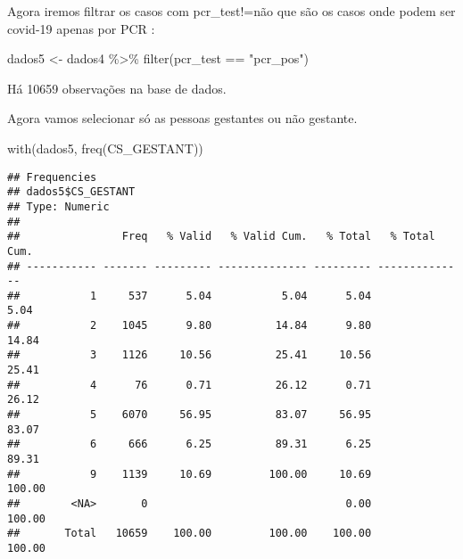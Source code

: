 \documentclass[
]{article}
\newenvironment{Shaded}{\begin{snugshade}}{\end{snugshade}}
\newcommand{\FunctionTok}[1]{\textcolor[rgb]{0.00,0.00,0.00}{#1}}
\newcommand{\NormalTok}[1]{#1}
\newcommand{\OtherTok}[1]{\textcolor[rgb]{0.56,0.35,0.01}{#1}}
\newcommand{\SpecialCharTok}[1]{\textcolor[rgb]{0.00,0.00,0.00}{#1}}
\newcommand{\StringTok}[1]{\textcolor[rgb]{0.31,0.60,0.02}{#1}}
\begin{document}
Agora iremos filtrar os casos com pcr\_test!=não que são os casos onde
podem ser covid-19 apenas por PCR :

\begin{Shaded}
\begin{Highlighting}[]
\NormalTok{dados5 }\OtherTok{\textless{}{-}}\NormalTok{ dados4 }\SpecialCharTok{\%\textgreater{}\%} 
  \FunctionTok{filter}\NormalTok{(pcr\_test }\SpecialCharTok{==} \StringTok{"pcr\_pos"}\NormalTok{)}
\end{Highlighting}
\end{Shaded}

Há 10659 observações na base de dados.

Agora vamos selecionar só as pessoas gestantes ou não gestante.

\begin{Shaded}
\begin{Highlighting}[]
\FunctionTok{with}\NormalTok{(dados5, }\FunctionTok{freq}\NormalTok{(CS\_GESTANT))}
\end{Highlighting}
\end{Shaded}

\begin{verbatim}
## Frequencies  
## dados5$CS_GESTANT  
## Type: Numeric  
## 
##                Freq   % Valid   % Valid Cum.   % Total   % Total Cum.
## ----------- ------- --------- -------------- --------- --------------
##           1     537      5.04           5.04      5.04           5.04
##           2    1045      9.80          14.84      9.80          14.84
##           3    1126     10.56          25.41     10.56          25.41
##           4      76      0.71          26.12      0.71          26.12
##           5    6070     56.95          83.07     56.95          83.07
##           6     666      6.25          89.31      6.25          89.31
##           9    1139     10.69         100.00     10.69         100.00
##        <NA>       0                               0.00         100.00
##       Total   10659    100.00         100.00    100.00         100.00
\end{verbatim}
\end{document}
